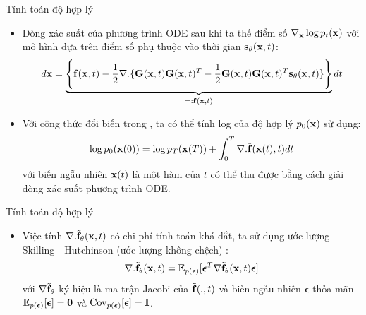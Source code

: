 \documentclass[10pt]{beamer}
\theoremstyle{remark}
\numberwithin{algocf}{section}
\numberwithin{equation}{section}
\numberwithin{dl}{section}
\numberwithin{figure}{section}
\begin{document}
\begin{frame}[shrink]{Tính toán độ hợp lý}
	\begin{itemize}
		\item Dòng xác suất của phương trình ODE sau khi ta thế điểm số $\nabla_{\bold{x}} \log p_t (\bold{x})$ với mô hình dựa trên điểm số phụ thuộc vào thời gian $\bold{s}_{\bold{\theta}}(\bold{x}, t)$:
		\begin{equation} \label{eq:38}
			d \bold{x} = \underbrace{\Bigg \lbrace \bold{f}(\bold{x}, t) - \dfrac{1}{2} \nabla . \lbrace \bold{G}(\bold{x}, t) \bold{G}(\bold{x}, t)^T - \dfrac{1}{2} \bold{G}(\bold{x}, t) \bold{G}(\bold{x}, t)^T \bold{s}_{\bold{\theta}} (\bold{x}, t) \rbrace \Bigg \rbrace}_{=: \tilde{\bold{f}}(\bold{x}, t)} dt
		\end{equation}
		\item Với công thức đổi biến trong \citep{chen2018neural}, ta có thể tính log của độ hợp lý $p_0 (\bold{x})$ sử dụng:
		\begin{equation} \label{eq:39}
			\log p_0 (\bold{x}(0)) = \log p_T (\bold{x}(T)) + \int_{0}^{T} \nabla . \tilde{\bold{f}}(\bold{x}(t), t) dt
		\end{equation}
		với biến ngẫu nhiên $\bold{x}(t)$ là một hàm của $t$ có thể thu được bằng cách giải dòng xác suất phương trình ODE.
	\end{itemize}
\end{frame}

\begin{frame}{Tính toán độ hợp lý}
	\begin{itemize}
		\item Việc tính $\nabla . \tilde{\bold{f}}_{\bold{\theta}}(\bold{x}, t)$ có chi phí tính toán khá đắt, ta sử dụng ước lượng Skilling - Hutchinson  (ước lượng không chệch) \citep{skilling1989eigenvalues,hutchinson1989stochastic}:
		\begin{equation} \label{eq:40}
			\nabla . \tilde{\bold{f}}_{\bold{\theta}}(\bold{x}, t) = \mathbb{E}_{p(\boldsymbol{\epsilon})} \lbrack \boldsymbol{\epsilon}^T \nabla \tilde{\bold{f}}_{\bold{\theta}} (\bold{x}, t) \boldsymbol{\epsilon} \rbrack
		\end{equation}
		với $\nabla \tilde{\bold{f}}_{\bold{\theta}}$ ký hiệu là ma trận Jacobi của $\tilde{\bold{f}}(., t)$ và biến ngẫu nhiên $\boldsymbol{\epsilon}$ thỏa mãn $\mathbb{E}_{p(\boldsymbol{\epsilon})} \lbrack \boldsymbol{\epsilon} \rbrack = \bold{0}$ và $\mathrm{Cov}_{p(\boldsymbol{\epsilon})} \lbrack \boldsymbol{\epsilon} \rbrack = \bold{I}$.
	\end{itemize}
\end{frame}
\end{document}
